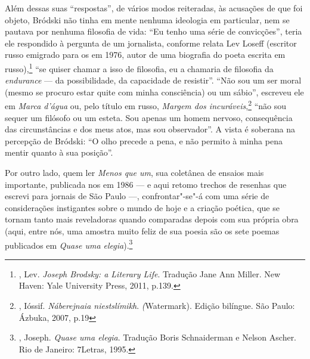 {Além dessas suas ``respostas'', de vários modos reiteradas, às
acusações de que foi objeto, Bródski não tinha em mente nenhuma
ideologia em particular, nem se pautava por nenhuma filosofia de vida:
``Eu tenho uma série de convicções'', teria ele respondido à
pergunta de um jornalista, conforme relata Lev Loseff (escritor russo emigrado
para os  em 1976, autor de uma biografia do poeta escrita
em russo),\footnote{, Lev. \emph{Joseph
 Brodsky: a Literary Life}. Tradução Jane Ann Miller. New Haven:
 Yale University Press, 2011, p.139.} ``se quiser
chamar a isso de filosofia, eu a chamaria de filosofia da
\emph{endurance} --- da possibilidade, da capacidade de resistir''.
``Não sou um ser moral (mesmo se procuro estar quite com minha
consciência) ou um sábio'', escreveu ele em \emph{Marca d'água} ou, pelo título em russo, \emph{Margem dos
incuráveis},\footnote{, Ióssif.
 \emph{Náberejnaia niestslímikh}. \emph(Watermark). Edição bilíngue.
 São Paulo: Ázbuka, 2007, p.19} ``não sou sequer um filósofo ou um
esteta. Sou apenas um homem nervoso, consequência das circunstâncias e
dos meus atos, mas sou observador''. A vista é soberana na percepção de
Bródski: ``O olho precede a pena, e não permito à minha pena mentir
quanto à sua posição''.

Por outro lado, quem ler \emph{Menos que um}, sua coletânea de ensaios
mais importante, publicada nos  em 1986 --- e aqui
retomo trechos de resenhas que escrevi para jornais de São Paulo ---,
confrontar"-se"-á com uma série de considerações instigantes sobre o mundo de hoje e a criação poética, que se tornam tanto mais
reveladoras quando comparadas depois com sua própria obra (aqui, entre
nós, uma amostra muito feliz de sua poesia são os sete poemas publicados
em \emph{Quase uma elegia}).\footnote{,
 Joseph. \emph{Quase uma elegia}. Tradução Boris Schnaiderman e Nelson
 Ascher. Rio de Janeiro: 7Letras, 1995.}

}
